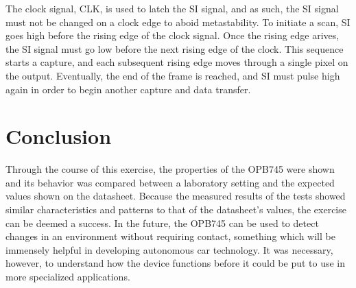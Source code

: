 \documentclass[conference]{IEEEtran}
\begin{document}
The clock signal, CLK, is used to latch the SI signal, and as such, the SI
signal must not be changed on a clock edge to aboid metastability. To
initiate a scan, SI goes high before the rising edge of the clock signal.
Once the rising edge arives, the SI signal must go low before the next
rising edge of the clock. This sequence starts a capture, and each subsequent
rising edge moves through a single pixel on the output. Eventually, the end
of the frame is reached, and SI must pulse high again in order to begin
another capture and data transfer.

\section{Conclusion}
Through the course of this exercise, the properties of the OPB745 were shown and its behavior was compared between a laboratory
setting and the expected values shown on the datasheet. Because the measured results of the tests showed similar characteristics and
patterns to that of the datasheet's values, the exercise can be deemed a success. In the future, the OPB745 can be used to detect changes
in an environment without requiring contact, something which will be immensely helpful in developing autonomous car technology. It was
necessary, however, to understand how the device functions before it could be put to use in more specialized applications.
\end{document}
